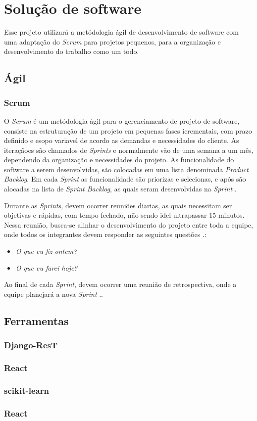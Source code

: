 \chapter[Solução de software]{Solução de software}
Esse projeto utilizará a metódologia ágil de desenvolvimento de software com uma adaptação do \textit{Scrum} para projetos pequenos, para a organização e desenvolvimento do trabalho como um todo.

\section{Ágil}
\subsection{Scrum}
O \textit{Scrum} é um metódologia ágil para o gerenciamento de projeto de software, consiste na estruturação de um projeto em pequenas fases icrementais, com prazo definido e esopo variavel de acordo as demandas e necessidades do cliente. As iteraçãoes são chamados de \textit{Sprints} e normalmente vão de uma semana a um mês, dependendo da organização e necessidades do projeto. As funcionalidade do software a serem desenvolvidas, são colocadas em uma lista denominada \textit{Product Backlog}. Em cada \textit{Sprint} as funcionalidade são priorizas e selecionas, e após são alocadas na lista de \textit{Sprint Backlog}, as quais seram desenvolvidas na \textit{Sprint} \cite{sutherland2016scrum}.

Durante as \textit{Sprints}, devem ocorrer reuniões diarias, as quais necessitam ser objetivas e rápidas, com tempo fechado, não sendo idel ultrapassar 15 minutos. Nessa reunião, busca-se alinhar o desenvolvimento do projeto entre toda a equipe, onde todos os integrantes devem responder as seguintes questões \cite{sutherland2016scrum}.:
\begin{itemize}
    \item \textit{O que eu fiz ontem?}
    \item \textit{O que eu farei hoje?}
\end{itemize}

Ao final de cada \textit{Sprint}, devem ocorrer uma reunião de retrospectiva, onde a equipe planejará a nova \textit{Sprint} \cite{sutherland2016scrum}..

\section{Ferramentas}

\subsection{Django-ResT}
\subsection{React}
\subsection{scikit-learn}
\subsection{React}
